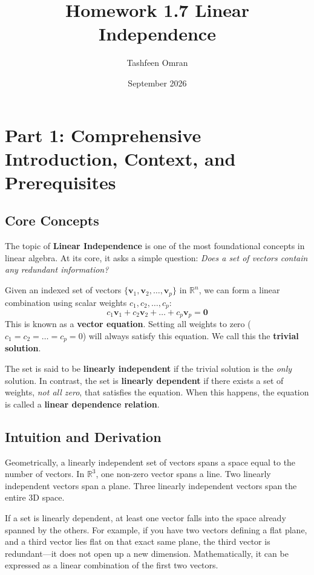 \documentclass[11pt]{article}
\title{Homework 1.7 Linear Independence}
\author{Tashfeen Omran}
\date{September 2026}
\begin{document}
\maketitle

\tableofcontents
\newpage

\section{Part 1: Comprehensive Introduction, Context, and Prerequisites}

\subsection{Core Concepts}
The topic of \textbf{Linear Independence} is one of the most foundational concepts in linear algebra. At its core, it asks a simple question: \textit{Does a set of vectors contain any redundant information?} 

Given an indexed set of vectors $\{ \mathbf{v}_1, \mathbf{v}_2, \dots, \mathbf{v}_p \}$ in $\mathbb{R}^n$, we can form a linear combination using scalar weights $c_1, c_2, \dots, c_p$:
\[ c_1\mathbf{v}_1 + c_2\mathbf{v}_2 + \dots + c_p\mathbf{v}_p = \mathbf{0} \]
This is known as a \textbf{vector equation}. Setting all weights to zero ($c_1 = c_2 = \dots = c_p = 0$) will always satisfy this equation. We call this the \textbf{trivial solution}. 

The set is said to be \textbf{linearly independent} if the trivial solution is the \textit{only} solution. In contrast, the set is \textbf{linearly dependent} if there exists a set of weights, \textit{not all zero}, that satisfies the equation. When this happens, the equation is called a \textbf{linear dependence relation}.

\subsection{Intuition and Derivation}
Geometrically, a linearly independent set of vectors spans a space equal to the number of vectors. In $\mathbb{R}^3$, one non-zero vector spans a line. Two linearly independent vectors span a plane. Three linearly independent vectors span the entire 3D space. 

If a set is linearly dependent, at least one vector falls into the space already spanned by the others. For example, if you have two vectors defining a flat plane, and a third vector lies flat on that exact same plane, the third vector is redundant---it does not open up a new dimension. Mathematically, it can be expressed as a linear combination of the first two vectors.
\end{document}
